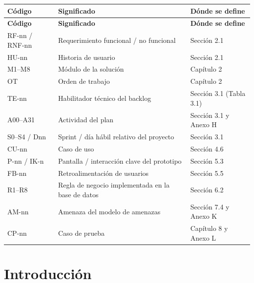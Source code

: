 \documentclass[11pt,a4paper]{article}
\begin{document}
\begingroup
\begin{longtable}{@{}>{\raggedright\arraybackslash\hspace{0pt}}p{}>{\raggedright\arraybackslash\hspace{0pt}}p{}>{\raggedright\arraybackslash\hspace{0pt}}p{}@{}}
\toprule
\textbf{Código} & \textbf{Significado} & \textbf{Dónde se define} \\ \midrule
\endfirsthead
\toprule
\textbf{Código} & \textbf{Significado} & \textbf{Dónde se define} \\ \midrule
\endhead
\bottomrule
\endlastfoot
RF-nn / RNF-nn & Requerimiento funcional / no funcional & Sección 2.1 \\ \addlinespace[0.25em]
\mbox{HU-nn} & Historia de usuario & Sección 2.1 \\ \addlinespace[0.25em]
\mbox{M1--M8} & Módulo de la solución & Capítulo 2 \\ \addlinespace[0.25em]
\mbox{OT} & Orden de trabajo & Capítulo 2 \\ \addlinespace[0.25em]
\mbox{TE-nn} & Habilitador técnico del backlog & Sección 3.1 (Tabla 3.1) \\ \addlinespace[0.25em]
\mbox{A00--A31} & Actividad del plan & Sección 3.1 y Anexo H \\ \addlinespace[0.25em]
S0--S4 / Dnn & Sprint / día hábil relativo del proyecto & Sección 3.1 \\ \addlinespace[0.25em]
\mbox{CU-nn} & Caso de uso & Sección 4.6 \\ \addlinespace[0.25em]
P-nn / IK-n & Pantalla / interacción clave del prototipo & Sección 5.3 \\ \addlinespace[0.25em]
\mbox{FB-nn} & Retroalimentación de usuarios & Sección 5.5 \\ \addlinespace[0.25em]
\mbox{R1--R8} & Regla de negocio implementada en la base de datos & Sección 6.2 \\ \addlinespace[0.25em]
\mbox{AM-nn} & Amenaza del modelo de amenazas & Sección 7.4 y Anexo K \\ \addlinespace[0.25em]
\mbox{CP-nn} & Caso de prueba & Capítulo 8 y Anexo L \\
\end{longtable}
\endgroup

\newpage
\section{Introducción}
\end{document}
